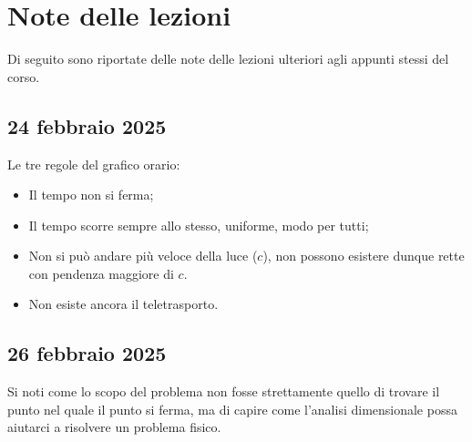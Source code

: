 \appendix 
\chapter{Note delle lezioni}
Di seguito sono riportate delle note delle lezioni ulteriori agli appunti stessi del corso.

\section{24 febbraio 2025}
\label{lez:24-02-2025}
Le tre regole del grafico orario:
\begin{itemize}
    \item Il tempo non si ferma;
    \item Il tempo scorre sempre allo stesso, uniforme, modo per tutti;
    \item Non si può andare più veloce della luce ($c$), non possono esistere dunque rette con pendenza maggiore di $c$.
    \item Non esiste ancora il teletrasporto.
\end{itemize}
\section{26 febbraio 2025}
\label{lez:26-02-2025}
Si noti come lo scopo del problema non fosse strettamente quello di trovare il punto nel quale il punto si ferma, ma di capire come l'analisi dimensionale possa aiutarci a risolvere un problema fisico.